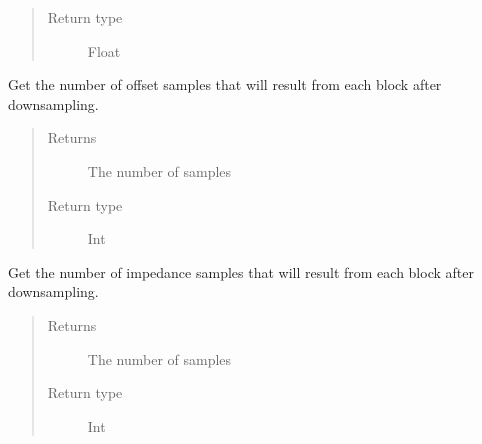 \documentclass[letterpaper,10pt,english]{sphinxmanual}
\begin{document}
\begin{fulllineitems}
\begin{fulllineitems}
\begin{quote}
\begin{description}
\item[{Return type}] \leavevmode
\sphinxAtStartPar
Float

\end{description}\end{quote}

\end{fulllineitems}


\begin{fulllineitems}
\label{\detokenize{index:TiePieLCR_settings.TiePieLCR_settings.get_final_offset_block_size}}
\sphinxAtStartPar
Get the number of offset samples that will result from each block after downsampling.
\begin{quote}\begin{description}
\item[{Returns}] \leavevmode
\sphinxAtStartPar
The number of samples

\item[{Return type}] \leavevmode
\sphinxAtStartPar
Int

\end{description}\end{quote}

\end{fulllineitems}


\begin{fulllineitems}
\label{\detokenize{index:TiePieLCR_settings.TiePieLCR_settings.get_final_output_block_size}}
\sphinxAtStartPar
Get the number of impedance samples that will result from each block after downsampling.
\begin{quote}\begin{description}
\item[{Returns}] \leavevmode
\sphinxAtStartPar
The number of samples

\item[{Return type}] \leavevmode
\sphinxAtStartPar
Int


\end{description}
\end{quote}
\end{fulllineitems}
\end{fulllineitems}
\end{document}
